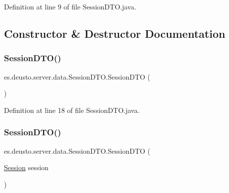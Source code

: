 Definition at line 9 of file Session\+D\+T\+O.\+java.



\subsection{Constructor \& Destructor Documentation}
\mbox{\label{classes_1_1deusto_1_1server_1_1data_1_1_session_d_t_o_a6bd48894fa99ffb816184e90a5a1fddc}} 
\subsubsection{\texorpdfstring{SessionDTO()}{SessionDTO()}\hspace{0.1cm}{\footnotesize\ttfamily [1/2]}}
{\footnotesize\ttfamily es.\+deusto.\+server.\+data.\+Session\+D\+T\+O.\+Session\+D\+TO (\begin{DoxyParamCaption}{ }\end{DoxyParamCaption})}



Definition at line 18 of file Session\+D\+T\+O.\+java.

\mbox{\label{classes_1_1deusto_1_1server_1_1data_1_1_session_d_t_o_a8bdfa9095064ac9b72508b348302c852}} 
\subsubsection{\texorpdfstring{SessionDTO()}{SessionDTO()}\hspace{0.1cm}{\footnotesize\ttfamily [2/2]}}
{\footnotesize\ttfamily es.\+deusto.\+server.\+data.\+Session\+D\+T\+O.\+Session\+D\+TO (\begin{DoxyParamCaption}\item[{\mbox{\hyperlink{classes_1_1deusto_1_1server_1_1jdo_1_1_session}{Session}}}]{session }\end{DoxyParamCaption})}




